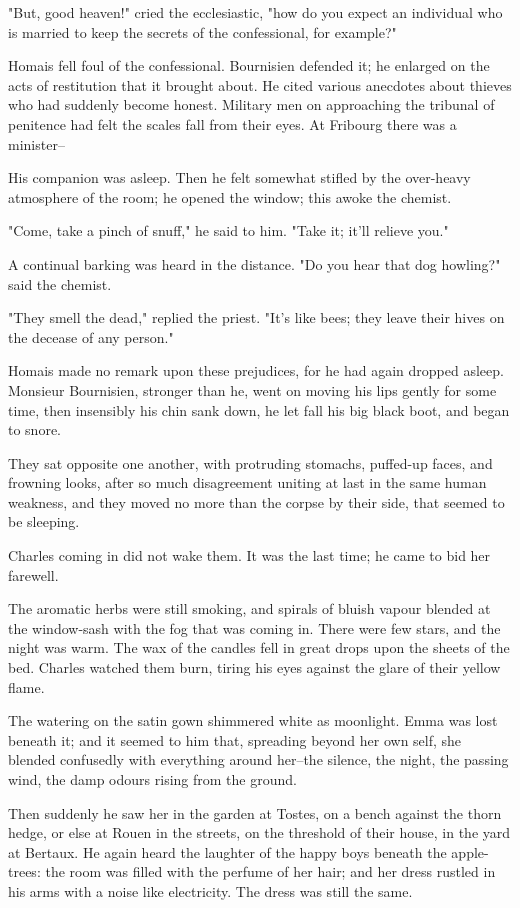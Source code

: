 \documentclass[11pt,twocolumn]{ltugboat}
\begin{document}
"But, good heaven!" cried the ecclesiastic, "how do you expect an
individual who is married to keep the secrets of the confessional, for
example?"

Homais fell foul of the confessional. Bournisien defended it; he
enlarged on the acts of restitution that it brought about. He cited
various anecdotes about thieves who had suddenly become honest. Military
men on approaching the tribunal of penitence had felt the scales fall
from their eyes. At Fribourg there was a minister--

His companion was asleep. Then he felt somewhat stifled by the
over-heavy atmosphere of the room; he opened the window; this awoke the
chemist.

"Come, take a pinch of snuff," he said to him. "Take it; it'll relieve
you."

A continual barking was heard in the distance. "Do you hear that dog
howling?" said the chemist.

"They smell the dead," replied the priest. "It's like bees; they leave
their hives on the decease of any person."

Homais made no remark upon these prejudices, for he had again dropped
asleep. Monsieur Bournisien, stronger than he, went on moving his lips
gently for some time, then insensibly his chin sank down, he let fall
his big black boot, and began to snore.

They sat opposite one another, with protruding stomachs, puffed-up
faces, and frowning looks, after so much disagreement uniting at last in
the same human weakness, and they moved no more than the corpse by their
side, that seemed to be sleeping.

Charles coming in did not wake them. It was the last time; he came to
bid her farewell.

The aromatic herbs were still smoking, and spirals of bluish vapour
blended at the window-sash with the fog that was coming in. There were
few stars, and the night was warm. The wax of the candles fell in great
drops upon the sheets of the bed. Charles watched them burn, tiring his
eyes against the glare of their yellow flame.

The watering on the satin gown shimmered white as moonlight. Emma was
lost beneath it; and it seemed to him that, spreading beyond her own
self, she blended confusedly with everything around her--the silence,
the night, the passing wind, the damp odours rising from the ground.

Then suddenly he saw her in the garden at Tostes, on a bench against the
thorn hedge, or else at Rouen in the streets, on the threshold of their
house, in the yard at Bertaux. He again heard the laughter of the happy
boys beneath the apple-trees: the room was filled with the perfume
of her hair; and her dress rustled in his arms with a noise like
electricity. The dress was still the same.
\end{document}
